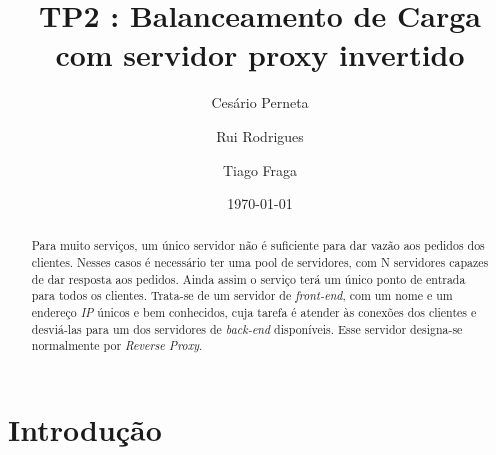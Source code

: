 \documentclass{llncs}
\begin{document}
\mainmatter
\title{TP2 : Balanceamento de Carga com servidor proxy invertido}


\author{Cesário Perneta \and Rui Rodrigues \and Tiago Fraga}



\date{\today}


\maketitle
\begin{abstract}
Para muito serviços, um único servidor não é suficiente para dar vazão aos pedidos dos clientes. Nesses casos é necessário ter uma pool de servidores, com N servidores capazes de dar resposta aos pedidos. Ainda assim o serviço terá um único ponto de entrada para todos os clientes. Trata-se de um servidor de \textit{front-end}, com um nome e um endereço \textit{IP} únicos e bem conhecidos, cuja tarefa é atender às conexões dos clientes e desviá-las para um dos servidores de \textit{back-end} disponíveis. Esse servidor designa-se normalmente por \textit{Reverse Proxy}.	
\end{abstract}



\section{Introdução} \label{intro}
\end{document}
